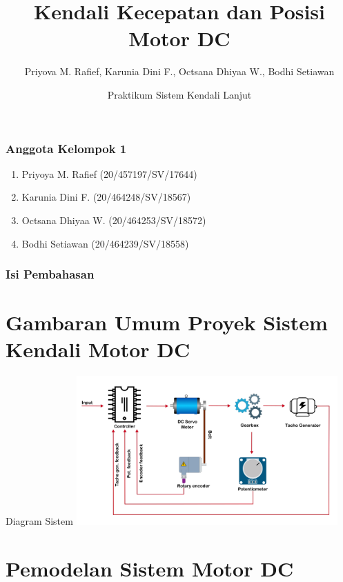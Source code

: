 \documentclass[10pt,xcolor={dvipsnames}]{beamer}
\title[UGM]{Kendali Kecepatan dan Posisi Motor DC}%
\author[Kelompok 1]{Priyova M. Rafief\inst{1}, Karunia Dini F.\inst{1}, Octsana Dhiyaa W.\inst{1}, Bodhi Setiawan\inst{1}}%
\institute[UGM]{Universitas Gadjah Mada\inst{1}}
\date[\textcolor{white}{PSKL, 2022}]
{Praktikum Sistem Kendali Lanjut}
\begin{document}
	

	\frame{\titlepage}
	
	\begin{frame}
		\frametitle{Anggota Kelompok 1}
		\begin{enumerate}
			\item Priyoya M. Rafief (20/457197/SV/17644)
			\item Karunia Dini F. (20/464248/SV/18567)
			\item Octsana Dhiyaa W. (20/464253/SV/18572)
			\item Bodhi Setiawan (20/464239/SV/18558)
		\end{enumerate}
	\end{frame}
	
	\begin{frame}
		\frametitle{Isi Pembahasan}
		    \tableofcontents
	\end{frame}
	
	\section{Gambaran Umum Proyek Sistem Kendali Motor DC}
	
	\begin{frame}{Diagram Sistem}
		\centering
		\includegraphics[width=10cm]{Gambar Lain/diagramDCservo.png}
	\end{frame}

	\section{Pemodelan Sistem Motor DC}
	
\end{document}

